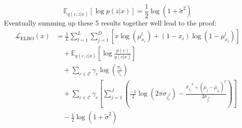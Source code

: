 \documentclass{article}
\begin{document}
\begin{enumerate}
    \begin{equation*}
        \mathbb{E}_{q(c,z|x)} [\log p(z|x)]  = \frac{1}{2}\log(1 + \tilde{\sigma}^2)
    \end{equation*}
    Eventually summing up these 5 results together well lead to the proof:
    \begin{equation*}
    \begin{aligned}
        \mathcal{L}_{\mathrm{ELBO}}(x) &= 
        \frac{1}{L} \sum_{l=1}^L \sum_{j=1}^D [x \log(\mu_{x_i}^l) + (1-x_i)\log(1-\mu_{x_i}^l)] \\
        &\quad + \mathbb{E}_{q(c,z|x)} \left[ \log \frac{p(c)}{q(c|x)} \right] \\
        &\quad + \sum_{c \in \mathcal{C}} \gamma_c \log\left(\frac{\pi_c}{\gamma_c}\right) \\
        &\quad + \sum_{c \in \mathcal{C}} \gamma_c 
        \left[
            \sum_{j=1}^J 
            \left(
                \frac{-1}{2} \log(2\pi \sigma_j_c^2) - 
                \frac{\tilde{\sigma_j_c}^2 + (\mu_j - \tilde{\mu_j_c})^2}{2\sigma_j_c^2}
            \right)
        \right] \\
        &\quad -\frac{1}{2}\log(1 + \tilde{\sigma}^2)
    \end{aligned}
    \end{equation*}

\end{enumerate}
\end{document}
